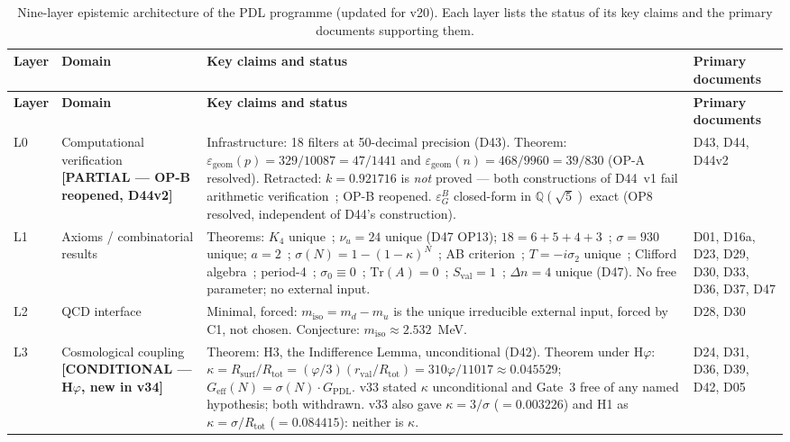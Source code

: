 \documentclass[11pt,a4paper]{article}
\theoremstyle{plain}
\theoremstyle{definition}
\theoremstyle{remark}
\newcommand{\Geff}{G_{\mathrm{eff}}}
\newcommand{\GPDL}{G_{\mathrm{PDL}}}
\newcommand{\rval}{r_{\mathrm{val}}}
\newcommand{\Rsurf}{R_{\mathrm{surf}}}
\newcommand{\Rtot}{R_{\mathrm{tot}}}
\newcommand{\sigmaN}{\sigma(N)}
\newcommand{\epsGeomB}{\varepsilon_G^B}
\begin{document}
\begin{longtable}{L{0.6cm}L{3.0cm}L{5.5cm}L{4.0cm}}
\caption{Nine-layer epistemic architecture of the PDL programme (updated for v20). Each layer lists the status of its key claims and the primary documents supporting them.}
\label{tab:epistemic}\\
\toprule
\textbf{Layer} & \textbf{Domain} & \textbf{Key claims and status} & \textbf{Primary documents}\\
\midrule
\endfirsthead
\toprule
\textbf{Layer} & \textbf{Domain} & \textbf{Key claims and status} & \textbf{Primary documents}\\
\midrule
\endhead
\bottomrule
\endfoot
L0 & Computational verification \textbf{[PARTIAL --- OP-B reopened, D44v2]} & \textcolor{proofblue}{Infrastructure}: 18 filters at 50-decimal precision (D43). \textcolor{proofblue}{Theorem}: $\varepsilon_{\mathrm{geom}}(p)=329/10087=47/1441$ and $\varepsilon_{\mathrm{geom}}(n)=468/9960=39/830$ (OP-A resolved). \textcolor{negativered}{Retracted}: $k=0.921716$ is \emph{not} proved --- both constructions of D44~v1 fail arithmetic verification~\cite{D44v2}; \textcolor{openproblemred}{OP-B reopened}. $\epsGeomB$ closed-form in $\mathbb{Q}(\sqrt{5})$ exact (OP8 resolved, independent of D44's construction). & D43, D44, D44v2\\[0.4em]
L1 & Axioms / combinatorial results & \textcolor{proofblue}{Theorems}: $K_4$ unique~\cite{D16a}; $\nu_u=24$ unique (D47 OP13); $18=6+5+4+3$~\cite{D23}; $\sigma=930$ unique; $a=2$~\cite{D30}; $\sigmaN=1-(1-\kappa)^N$~\cite{D24}; AB criterion~\cite{D29}; $T=-i\sigma_2$ unique~\cite{D33}; Clifford algebra~\cite{D33}; period-4~\cite{D33}; $\sigma_0\equiv 0$~\cite{D36}; $\mathrm{Tr}(A)=0$~\cite{D36}; $S_{\mathrm{val}}=1$~\cite{D37}; $\Delta n=4$ unique (D47). No free parameter; no external input. & D01, D16a, D23, D29, D30, D33, D36, D37, D47\\[0.4em]
L2 & QCD interface & Minimal, forced: $m_{\mathrm{iso}}=m_d-m_u$ is the unique irreducible external input, forced by C1, not chosen. \textcolor{conjecturegreen}{Conjecture}: $m_{\mathrm{iso}}\approx 2.532$~MeV. & D28, D30\\[0.4em]
L3 & Cosmological coupling \textbf{[CONDITIONAL --- H$\varphi$, new in v34]} & \textcolor{proofblue}{Theorem}: H3, the Indifference Lemma, unconditional (D42). \textcolor{hypothesisorange}{Theorem under H$\varphi$}: $\kappa=\Rsurf/\Rtot=(\varphi/3)(\rval/\Rtot)=310\varphi/11017\approx0.045529$; $\Geff(N)=\sigmaN\cdot\GPDL$. \textcolor{negativered}{v33 stated $\kappa$ unconditional and Gate~3 free of any named hypothesis; both withdrawn. v33 also gave $\kappa=3/\sigma$ ($=0.003226$) and H1 as $\kappa=\sigma/\Rtot$ ($=0.084415$): neither is $\kappa$.} & D24, D31, D36, D39, D42, D05\\[0.4em]

\end{longtable}
\end{document}
